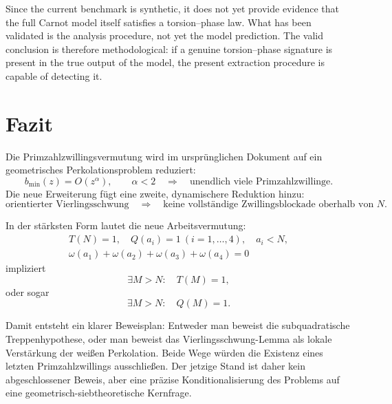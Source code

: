\documentclass[11pt,a4paper]{article}
\theoremstyle{definition}
\begin{document}
Since the current benchmark is synthetic, it does not yet provide evidence that the full Carnot model itself satisfies a torsion--phase law. What has been validated is the analysis procedure, not yet the model prediction. The valid conclusion is therefore methodological: if a genuine torsion--phase signature is present in the true output of the model, the present extraction procedure is capable of detecting it.

\section{Fazit}

Die Primzahlzwillingsvermutung wird im ursprünglichen Dokument auf ein geometrisches Perkolationsproblem reduziert:
\[
b_{\min}(z)=O(z^\alpha),\qquad \alpha<2
\quad\Longrightarrow\quad
\text{unendlich viele Primzahlzwillinge}.
\]
Die neue Erweiterung fügt eine zweite, dynamischere Reduktion hinzu:
\[
\text{orientierter Vierlingsschwung}
\quad\Longrightarrow\quad
\text{keine vollständige Zwillingsblockade oberhalb von }N.
\]

In der stärksten Form lautet die neue Arbeitsvermutung:
\[
\begin{gathered}
T(N)=1,\quad Q(a_i)=1\ (i=1,\dots,4),\quad a_i<N,\\
\omega(a_1)+\omega(a_2)+\omega(a_3)+\omega(a_4)=0
\end{gathered}
\]
impliziert
\[
\exists M>N:\quad T(M)=1,
\]
oder sogar
\[
\exists M>N:\quad Q(M)=1.
\]

Damit entsteht ein klarer Beweisplan: Entweder man beweist die subquadratische Treppenhypothese, oder man beweist das Vierlingsschwung-Lemma als lokale Verstärkung der weißen Perkolation. Beide Wege würden die Existenz eines letzten Primzahlzwillings ausschließen. Der jetzige Stand ist daher kein abgeschlossener Beweis, aber eine präzise Konditionalisierung des Problems auf eine geometrisch-siebtheoretische Kernfrage.
\end{document}
